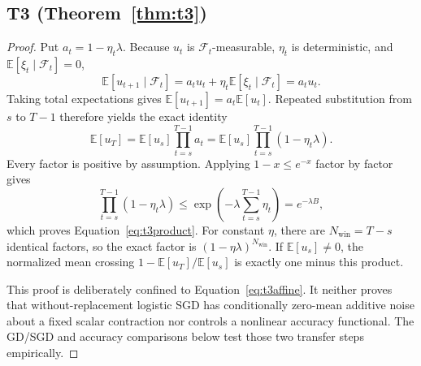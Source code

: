 \documentclass{article}
\newcommand{\B}{B}            %
\begin{document}
\subsection{T3 (Theorem~\ref{thm:t3})}
\begin{proof}[Proof]
Put $a_t=1-\eta_t\lambda$. Because $u_t$ is $\mathcal F_t$-measurable,
$\eta_t$ is deterministic, and $\mathbb E[\xi_t\mid\mathcal F_t]=0$,
\begin{equation}
\mathbb E[u_{t+1}\mid\mathcal F_t]
=a_tu_t+\eta_t\mathbb E[\xi_t\mid\mathcal F_t]=a_tu_t.
\end{equation}
Taking total expectations gives $\mathbb E[u_{t+1}]=a_t\mathbb E[u_t]$.
Repeated substitution from $s$ to $T-1$ therefore yields the exact identity
\begin{equation}
\mathbb E[u_T]=\mathbb E[u_s]\prod_{t=s}^{T-1}a_t
=\mathbb E[u_s]\prod_{t=s}^{T-1}(1-\eta_t\lambda).
\end{equation}
Every factor is positive by assumption. Applying $1-x\leq e^{-x}$ factor by factor gives
\begin{equation}
\prod_{t=s}^{T-1}(1-\eta_t\lambda)
\leq \exp\!\left(-\lambda\sum_{t=s}^{T-1}\eta_t\right)
=e^{-\lambda\B},
\end{equation}
which proves Equation~\ref{eq:t3product}. For constant $\eta$, there are
$N_{\mathrm{win}}=T-s$ identical factors, so the exact factor is
$(1-\eta\lambda)^{N_{\mathrm{win}}}$. If $\mathbb E[u_s]\neq0$, the normalized mean
crossing $1-\mathbb E[u_T]/\mathbb E[u_s]$ is exactly one minus this product.

This proof is deliberately confined to Equation~\ref{eq:t3affine}. It neither proves that
without-replacement logistic SGD has conditionally zero-mean additive noise about a fixed
scalar contraction nor controls a nonlinear accuracy functional. The GD/SGD and accuracy
comparisons below test those two transfer steps empirically.
\end{proof}
\end{document}
